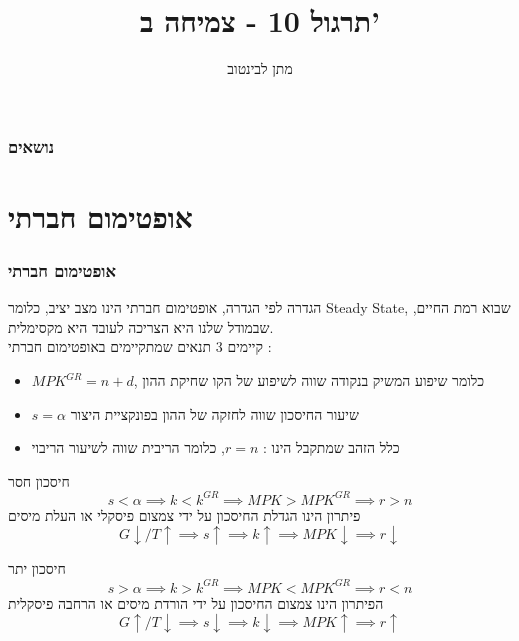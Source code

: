 \documentclass[usenames,dvipsnames]{beamer}
\title{תרגול 10 - צמיחה ב'}
\author{\texthebrew{ מתן לבינטוב}}
\institute[{{ אב"ג}}]{{ אוניברסיטת בן גוריון בנגב}}
\begin{document}
\begin{RTL}
\begin{frame}
\titlepage
\end{frame}
\begin{frame}
    \frametitle{נושאים}
    \tableofcontents
\end{frame}

\section{אופטימום חברתי}


\begin{frame}[allowframebreaks]
    \frametitle{אופטימום חברתי}
    \begin{block}{הגדרה}
        לפי הגדרה, אופטימום חברתי הינו מצב יציב, כלומר Steady State, שבוא רמת החיים, שבמודל שלנו היא הצריכה לעובד היא מקסימלית. \\
        קיימים 3 תנאים שמתקיימים באופטימום חברתי : 
        \begin{itemize}
            \item $MPK^{GR} = n + d  $, כלומר שיפוע המשיק בנקודה שווה לשיפוע של הקו שחיקת ההון
            \item $s = \alpha$ שיעור החיסכון שווה לחזקה של ההון בפונקציית היצור
            \item כלל הזהב שמתקבל הינו : $r = n$, כלומר הריבית שווה לשיעור הריבוי
        \end{itemize}  
    \end{block}

    \framebreak

    \begin{alertblock}{חיסכון חסר}
        $$s < \alpha \implies k < k^{GR} \implies MPK > MPK^{GR} \implies r > n$$
        פיתרון הינו הגדלת החיסכון על ידי צמצום פיסקלי או העלת מיסים 
        $$G \downarrow  / T \uparrow \implies s \uparrow \implies k \uparrow \implies MPK \downarrow \implies r \downarrow$$
    \end{alertblock}

    \begin{exampleblock}{חיסכון יתר}
        $$s > \alpha \implies k > k^{GR} \implies MPK < MPK^{GR} \implies r < n$$   
        הפיתרון הינו צמצום החיסכון על ידי הורדת מיסים או הרחבה פיסקלית
        $$G \uparrow  / T \downarrow \implies s \downarrow \implies k \downarrow \implies MPK \uparrow \implies r \uparrow$$
    \end{exampleblock}
    

\end{frame}


\end{RTL}
\end{document}
